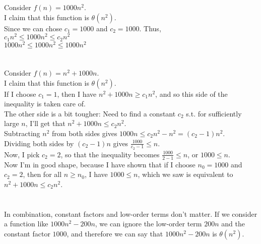 \documentclass{article}
\begin{document}
Consider $f(n) = 1000n^{2}$. \\

I claim that this function is $\theta(n^2)$. \\

Since we can chose $c_{1} = 1000$ and $c_{2} = 1000$. Thus, \\ 

$c_{1}n^{2} \leq 1000n^{2} \leq c_{2}n^{2}$  \\

$1000n^{2} \leq 1000n^{2} \leq 1000n^{2}$  \\ \\ \\





Consider $f(n) = n^{2}+1000n$. \\

I claim that this function is $\theta(n^2)$. \\

If I choose $c_1=1$, then I have $n^2+1000n \ge c_1n^2$, and so this side of the inequality is taken care of. \\

The other side is a bit tougher: Need to find a constant $c_2$ s.t. for sufficiently large $n$, I'll get that $n^2+1000n \leq c_2 n^2$. \\

Subtracting $n^2$ from both sides gives $1000n \leq c_2n^2-n^2=(c_2-1)n^2$. \\

Dividing both sides by $(c_2-1)n$ gives $\frac{1000}{c_2-1} \leq n$. \\

Now, I pick $c_2=2$, so that the inequality becomes $\frac{1000}{2-1} \leq n$, or $1000 \leq n$. \\

Now I'm in good shape, because I have shown that if I choose $n_0=1000$ and $c_2=2$, then for all $n \ge n_0$, I have $1000 \leq n$, which we saw is equivalent to $n^2+1000n \leq c_2n^2$. \\ \\ \\



In combination, constant factors and low-order terms don't matter. If we consider a function like $1000n^2-200n$, we can ignore the low-order term $200n$ and the constant factor $1000$, and therefore we can say that $1000n^2-200n$ is $\theta(n^2)$.
\end{document}

